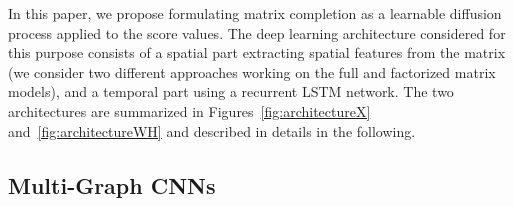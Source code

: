 \documentclass{article}
\begin{document}
In this paper, we propose formulating matrix completion as a learnable diffusion process applied to the score values. 
The deep learning architecture considered for this purpose consists of a spatial part extracting spatial features from the matrix (we consider two different approaches working on the full and factorized matrix models), and a temporal part using a recurrent LSTM network. The two architectures are summarized in Figures~\ref{fig:architectureX} and~\ref{fig:architectureWH} and described in details in the following.














 
\subsection{Multi-Graph CNNs}






\begin{figure*}[ht!]
\centering
\vspace{1mm}
\caption{Separable Recurrent GCNN (sRGCNN) architecture using the factorized matrix completion model and operating separately on the rows and columns of the factors $\mathbf{W}$, $\mathbf{H}^\top$. The output of the GCNN module is a $q$-dimensional feature vector for each input row/column, respectively. The number of parameters to learn is $\mathcal{O}(1)$ and the learning complexity is $\mathcal{O}(m+n)$.
 }
\label{fig:architectureWH}
\end{figure*}
\end{document}
